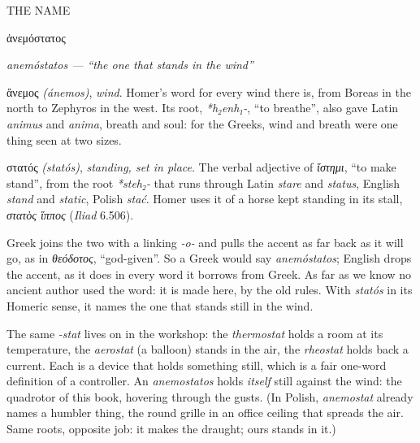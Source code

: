 \thispagestyle{empty}
\vspace*{22mm}
\noindent\begin{minipage}{118mm}
{\sanscaps\small\color{accent}THE NAME}\par\vspace{9mm}
{\displayserif\fontsize{34}{40}\selectfont ἀνεμόστατος}\par\vspace{3mm}
{\displayserif\itshape\fontsize{14}{18}\selectfont anemóstatos — “the one that stands in the wind”}\par\vspace{12mm}
\rmfamily\linespread{1.16}\selectfont
{\displayserif\fontsize{13}{16}\selectfont ἄνεμος} \emph{(ánemos)}, \emph{wind}. Homer's word for every wind there is,
from Boreas in the north to Zephyros in the west. Its root, \emph{*h₂enh₁-}, “to breathe”, also gave Latin
\emph{animus} and \emph{anima}, breath and soul: for the Greeks, wind and breath were one thing seen at two sizes.\par\medskip
{\displayserif\fontsize{13}{16}\selectfont στατός} \emph{(statós)}, \emph{standing, set in place}. The verbal adjective of
\emph{ἵστημι}, “to make stand”, from the root \emph{*steh₂-} that runs through Latin \emph{stare} and \emph{status},
English \emph{stand} and \emph{static}, Polish \emph{stać}. Homer uses it of a horse kept standing in its stall,
\emph{στατὸς ἵππος} (\emph{Iliad} 6.506).\par\medskip
Greek joins the two with a linking \emph{-o-} and pulls the accent as far back as it will go, as in \emph{θεόδοτος},
“god-given”. So a Greek would say \emph{anemóstatos}; English drops the accent, as it does in every word it
borrows from Greek. As far as we know no ancient author used the word: it is made here, by the old rules.
With \emph{statós} in its Homeric sense, it names the one that stands still in the wind.\par\medskip
The same \emph{-stat} lives on in the workshop: the \emph{thermostat} holds a room at its temperature, the
\emph{aerostat} (a balloon) stands in the air, the \emph{rheostat} holds back a current. Each is a device that holds
something still, which is a fair one-word definition of a controller. An \emph{anemostatos} holds \emph{itself}
still against the wind: the quadrotor of this book, hovering through the gusts. (In Polish, \emph{anemostat}
already names a humbler thing, the round grille in an office ceiling that spreads the air. Same roots,
opposite job: it makes the draught; ours stands in it.)
\end{minipage}
\clearpage

